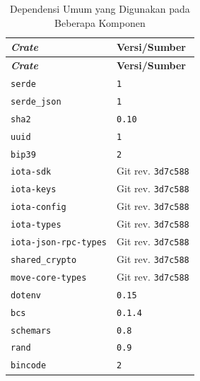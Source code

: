 \documentclass[bahasa, 12pt, a4paper, onecolumn, oneside, final]{report}
\begin{document}
\begin{longtable}{|>{\raggedright\arraybackslash}p{}|>{\raggedright\arraybackslash}p{}|}
	\caption{Dependensi Umum yang Digunakan pada Beberapa Komponen}
	\label{tab:dependensi-umum}                                       \\
	\hline
	\textbf{\textit{Crate}}               & \textbf{Versi/Sumber}     \\
	\hline
	\endfirsthead
	\hline
	\textbf{\textit{Crate}}               & \textbf{Versi/Sumber}     \\
	\hline
	\endhead

	\texttt{serde}                        & \texttt{1}                \\ \hline
	\texttt{serde\_json}                  & \texttt{1}                \\ \hline
	\texttt{sha2}                         & \texttt{0.10}             \\ \hline
	\texttt{uuid}                         & \texttt{1}                \\ \hline
	\texttt{bip39}                        & \texttt{2}                \\ \hline
	\texttt{iota-sdk}                     & Git rev. \texttt{3d7c588} \\ \hline
	\texttt{iota-keys}                    & Git rev. \texttt{3d7c588} \\ \hline
	\texttt{iota-config}                  & Git rev. \texttt{3d7c588} \\ \hline
	\texttt{iota-types}                   & Git rev. \texttt{3d7c588} \\ \hline
	\texttt{iota-json-rpc-types}          & Git rev. \texttt{3d7c588} \\ \hline
	\texttt{shared\_crypto}               & Git rev. \texttt{3d7c588} \\ \hline
	\texttt{move-core-types}              & Git rev. \texttt{3d7c588} \\ \hline
	\texttt{dotenv}                       & \texttt{0.15}             \\ \hline
	\texttt{bcs}                          & \texttt{0.1.4}            \\ \hline
	\texttt{schemars}                     & \texttt{0.8}              \\ \hline
	\texttt{rand}                         & \texttt{0.9}              \\ \hline
	\texttt{bincode}                      & \texttt{2}                \\ \hline

\end{longtable}
\end{document}
